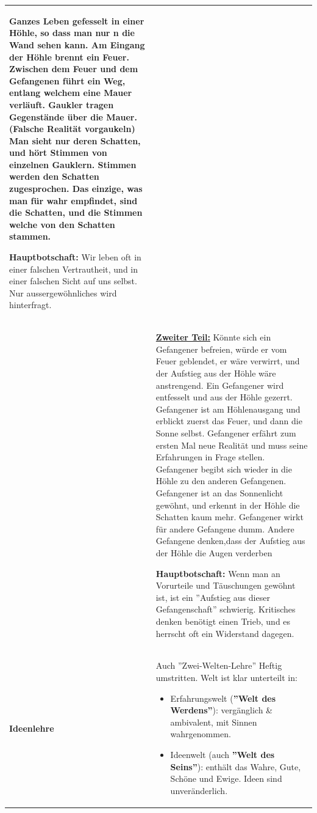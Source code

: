 \begin{longtable}{>{\bfseries}p{}p{}}
						Ganzes Leben gefesselt in einer Höhle, so dass man nur n die Wand sehen kann.\newline
						Am Eingang der Höhle brennt ein Feuer.
						Zwischen dem Feuer und dem Gefangenen führt ein Weg, entlang welchem eine Mauer verläuft.\newline
						Gaukler tragen Gegenstände über die Mauer. (Falsche Realität vorgaukeln)\newline
						Man sieht nur deren Schatten, und hört Stimmen von einzelnen Gauklern.\newline
						Stimmen werden den Schatten zugesprochen.\newline
						Das einzige, was man für wahr empfindet, sind die Schatten, und die Stimmen welche von den Schatten stammen.\newline
						
						 \textbf{Hauptbotschaft:} Wir leben oft in einer falschen Vertrautheit, und in einer falschen Sicht auf uns selbst. Nur aussergewöhnliches wird hinterfragt.
						\\
					& \textbf{\underline{Zweiter Teil:}} \newline
						Könnte sich ein Gefangener befreien, würde er vom Feuer geblendet, er wäre verwirrt, und der Aufstieg aus der Höhle wäre anstrengend.\newline
						Ein Gefangener wird entfesselt und aus der Höhle gezerrt.\newline
						Gefangener ist am Höhlenausgang und erblickt zuerst das Feuer, und dann die Sonne selbst.\newline
						Gefangener erfährt zum ersten Mal neue Realität und muss seine Erfahrungen in Frage stellen.\newline 
						Gefangener begibt sich wieder in die Höhle zu den anderen Gefangenen.\newline
						Gefangener ist an das Sonnenlicht gewöhnt, und erkennt in der Höhle die Schatten kaum mehr.\newline
						Gefangener wirkt für andere Gefangene dumm.\newline
						Andere Gefangene denken,dass der Aufstieg aus der Höhle die Augen verderben\newline
						
						 \textbf{Hauptbotschaft:} Wenn man an Vorurteile und Täuschungen gewöhnt ist, ist ein ''Aufstieg aus dieser Gefangenschaft'' schwierig. Kritisches denken benötigt einen Trieb, und es herrscht oft ein Widerstand dagegen.
						\\
			\hline
			Ideenlehre
				& Auch ''Zwei-Welten-Lehre''\newline
					Heftig umstritten.\newline
					Welt ist klar unterteilt in:
					\begin{itemize}
					  \item Erfahrungswelt (\textbf{''Welt des Werdens''}): vergänglich \& ambivalent, mit Sinnen wahrgenommen.
					  \item Ideenwelt (auch \textbf{''Welt des Seins''}):	enthält das Wahre, Gute, Schöne und Ewige. Ideen sind unveränderlich.
					\end{itemize}
					

\end{longtable}
